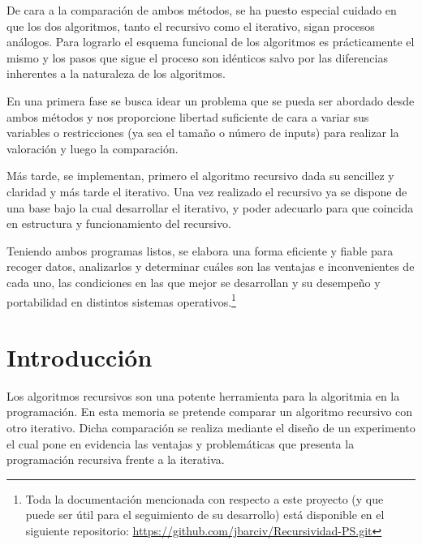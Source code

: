 \documentclass[12pt,a4paper]{article}
\begin{document}
\vspace{0.2cm}
De cara a la comparación de ambos métodos, se ha puesto especial cuidado en que los dos algoritmos, tanto el recursivo como el iterativo, sigan procesos análogos. Para lograrlo el esquema funcional de los algoritmos es prácticamente el mismo y los pasos que sigue el proceso son idénticos salvo por las diferencias inherentes a la naturaleza de los algoritmos.

\vspace{0.2cm}
En una primera fase se busca idear un problema que se pueda ser abordado desde ambos métodos y nos proporcione libertad suficiente de cara a variar sus variables o restricciones (ya sea el tamaño o número de inputs) para realizar la valoración y luego la comparación.

\vspace{0.2cm}
Más tarde, se implementan, primero el algoritmo recursivo dada su sencillez y claridad y más tarde el iterativo. Una vez realizado el recursivo ya se dispone de una base bajo la cual desarrollar el iterativo, y poder adecuarlo para que coincida en estructura y funcionamiento del recursivo.

\vspace{0.2cm}
Teniendo ambos programas listos, se elabora una forma eficiente y fiable para recoger datos, analizarlos y determinar cuáles son las ventajas e inconvenientes de cada uno, las condiciones en las que mejor se desarrollan y su desempeño y portabilidad en distintos sistemas operativos.\footnote{Toda la documentación mencionada con respecto a este proyecto (y que puede ser útil para el seguimiento de su desarrollo) está disponible en el siguiente repositorio: \url{https://github.com/jbarciv/Recursividad-PS.git}}
\clearpage
{
 \hypersetup{linkcolor=black}%
 
 \tableofcontents
}

\clearpage



\section*{Introducción}
Los algoritmos recursivos son una potente herramienta para la algoritmia en la programación. En esta memoria se pretende comparar un algoritmo recursivo con otro iterativo. Dicha comparación se realiza mediante el diseño de un experimento el cual pone en evidencia las ventajas y problemáticas que presenta la programación recursiva frente a la iterativa.
\end{document}
